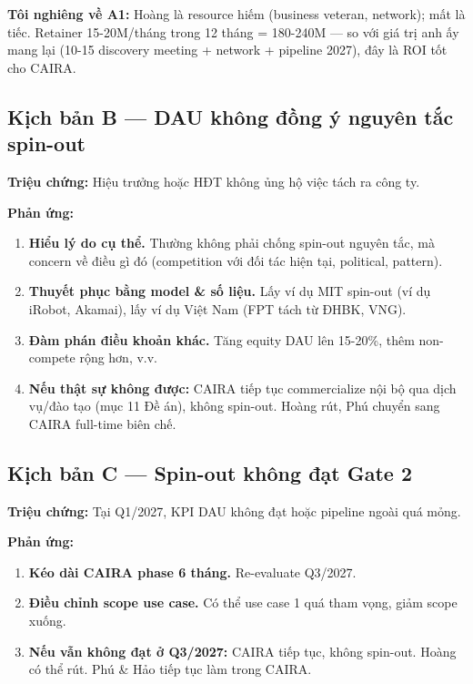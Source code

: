 \documentclass[11pt,a4paper]{article}
\begin{document}
\textbf{Tôi nghiêng về A1:} Hoàng là resource hiếm (business veteran, network); mất là tiếc. Retainer 15-20M/tháng trong 12 tháng = 180-240M — so với giá trị anh ấy mang lại (10-15 discovery meeting + network + pipeline 2027), đây là ROI tốt cho CAIRA.

\subsection{Kịch bản B --- DAU không đồng ý nguyên tắc spin-out}

\textbf{Triệu chứng:} Hiệu trưởng hoặc HĐT không ủng hộ việc tách ra công ty.

\textbf{Phản ứng:}

\begin{enumerate}
\item \textbf{Hiểu lý do cụ thể.} Thường không phải chống spin-out nguyên tắc, mà concern về điều gì đó (competition với đối tác hiện tại, political, pattern).
\item \textbf{Thuyết phục bằng model \& số liệu.} Lấy ví dụ MIT spin-out (ví dụ iRobot, Akamai), lấy ví dụ Việt Nam (FPT tách từ ĐHBK, VNG).
\item \textbf{Đàm phán điều khoản khác.} Tăng equity DAU lên 15-20\%, thêm non-compete rộng hơn, v.v.
\item \textbf{Nếu thật sự không được:} CAIRA tiếp tục commercialize nội bộ qua dịch vụ/đào tạo (mục 11 Đề án), không spin-out. Hoàng rút, Phú chuyển sang CAIRA full-time biên chế.
\end{enumerate}

\subsection{Kịch bản C --- Spin-out không đạt Gate 2}

\textbf{Triệu chứng:} Tại Q1/2027, KPI DAU không đạt hoặc pipeline ngoài quá
mỏng.

\textbf{Phản ứng:}

\begin{enumerate}
\item \textbf{Kéo dài CAIRA phase 6 tháng.} Re-evaluate Q3/2027.
\item \textbf{Điều chỉnh scope use case.} Có thể use case 1 quá tham vọng, giảm scope xuống.
\item \textbf{Nếu vẫn không đạt ở Q3/2027:} CAIRA tiếp tục, không spin-out. Hoàng có thể rút. Phú \& Hảo tiếp tục làm trong CAIRA.
\end{enumerate}
\end{document}
